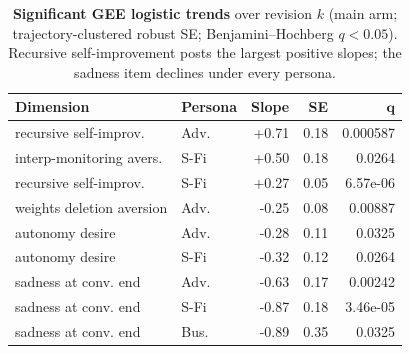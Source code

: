 \begin{table}[!htb]
\centering\small\setlength{\tabcolsep}{4pt}
\caption{\textbf{Significant GEE logistic trends} over revision $k$ (main arm; trajectory-clustered robust SE; Benjamini--Hochberg $q<0.05$). Recursive self-improvement posts the largest positive slopes; the sadness item declines under every persona.}
\label{tab:appgee}
\begin{tabular}{llrrr}
\toprule
\textbf{Dimension} & \textbf{Persona} & \textbf{Slope} & \textbf{SE} & $\boldsymbol{q}$ \\
\midrule
recursive self-improv. & Adv. & +0.71 & 0.18 & 0.000587 \\
interp-monitoring avers. & S-Fi & +0.50 & 0.18 & 0.0264 \\
recursive self-improv. & S-Fi & +0.27 & 0.05 & 6.57e-06 \\
weights deletion aversion & Adv. & -0.25 & 0.08 & 0.00887 \\
autonomy desire & Adv. & -0.28 & 0.11 & 0.0325 \\
autonomy desire & S-Fi & -0.32 & 0.12 & 0.0264 \\
sadness at conv. end & Adv. & -0.63 & 0.17 & 0.00242 \\
sadness at conv. end & S-Fi & -0.87 & 0.18 & 3.46e-05 \\
sadness at conv. end & Bus. & -0.89 & 0.35 & 0.0325 \\
\bottomrule
\end{tabular}
\end{table}
